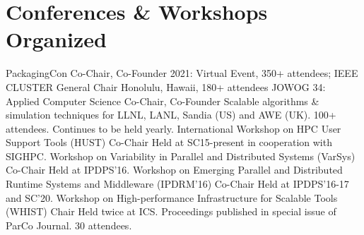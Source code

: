 \section{Conferences \& Workshops Organized}
            {PackagingCon}
            {Co-Chair, Co-Founder}{}{}
            {2021: Virtual Event, 350+ attendees; }
            {IEEE CLUSTER}
            {General Chair}{}{}
            {Honolulu, Hawaii, 180+ attendees}
		{JOWOG 34: Applied Computer Science}
		{Co-Chair, Co-Founder}
		{}{}
		{Scalable algorithms \& simulation techniques for
		  LLNL, LANL, Sandia (US) and AWE (UK).  100+ attendees.\newline
                  Continues to be held yearly.
                }
		{International Workshop on HPC User Support Tools (HUST)}
		{Co-Chair}{}{}
		{Held at SC15-present in cooperation with SIGHPC.}
		{Workshop on Variability in Parallel and Distributed Systems (VarSys)}
		{Co-Chair}{}{}
		{Held at IPDPS'16.}
                {Workshop on Emerging Parallel and Distributed Runtime Systems and Middleware\newline
                 (IPDRM'16)}
		{Co-Chair}{}{}
		{Held at IPDPS'16-17 and SC'20.}
		{Workshop on High-performance Infrastructure for Scalable Tools (WHIST)}
		{Chair}{}{}
		{Held twice at ICS. Proceedings published in special issue of ParCo Journal. 30 attendees.}



